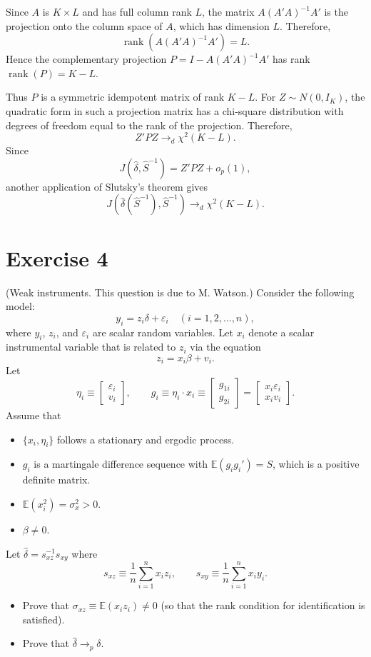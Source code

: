 \documentclass[12pt, letterpaper, onecolumn]{exam}
\begin{document}
\begin{solution}
    Since \(A\) is \(K\times L\) and has full column rank \(L\), the matrix $A(A'A)^{-1}A'$ is the projection onto the column space of \(A\), which has dimension \(L\). Therefore,
    $$
        \operatorname{rank}\!\left(A(A'A)^{-1}A'\right)=L.
    $$
    Hence the complementary projection $P=I-A(A'A)^{-1}A'$ has rank $\operatorname{rank}(P)=K-L.$

    Thus \(P\) is a symmetric idempotent matrix of rank \(K-L\). For \(Z\sim N(0,I_K)\), the quadratic form in such a projection matrix has a chi-square distribution with degrees of freedom equal to the rank of the projection. Therefore,
    $$
        Z'PZ\to_d \chi^2(K-L).
    $$
    Since
    $$
        J(\hat\delta,\hat S^{-1})=Z'PZ+o_p(1),
    $$
    another application of Slutsky's theorem gives
    $$
        J(\hat\delta(\hat S^{-1}),\hat S^{-1})\to_d \chi^2(K-L).
    $$
\end{solution}

\section*{Exercise 4}
 (Weak instruments. This question is due to M. Watson.) Consider the following model:
$$
    y_i = z_i \delta + \varepsilon_i \quad (i = 1,2,\ldots,n),
$$
where $y_i$, $z_i$, and $\varepsilon_i$ are scalar random variables. Let $x_i$ denote a scalar instrumental variable that is related to $z_i$ via the equation
$$
    z_i = x_i \beta + v_i.
$$
Let
$$
    \eta_i \equiv
    \begin{bmatrix}
        \varepsilon_i \\
        v_i
    \end{bmatrix},
    \qquad
    g_i \equiv \eta_i \cdot x_i \equiv
    \begin{bmatrix}
        g_{1i} \\
        g_{2i}
    \end{bmatrix}
    =
    \begin{bmatrix}
        x_i \varepsilon_i \\
        x_i v_i
    \end{bmatrix}.
$$
Assume that
\begin{itemize}
    \item[(1)] $\{x_i,\eta_i\}$ follows a stationary and ergodic process.
    \item[(2)] $g_i$ is a martingale difference sequence with $\mathbb{E}(g_i g_i') = S$, which is a positive definite matrix.
    \item[(3)] $\mathbb{E}(x_i^2)=\sigma_x^2>0$.
    \item[(4)] $\beta \neq 0$.
\end{itemize}
Let $\hat\delta = s_{xz}^{-1}s_{xy}$ where
$$
    s_{xz} \equiv \frac{1}{n}\sum_{i=1}^n x_i z_i,
    \qquad
    s_{xy} \equiv \frac{1}{n}\sum_{i=1}^n x_i y_i.
$$
\begin{itemize}
    \item[(a)] Prove that $\sigma_{xz} \equiv \mathbb{E}(x_i z_i) \neq 0$ (so that the rank condition for identification is satisfied).
    \item[(b)] Prove that $\hat\delta \to_p \delta$.
\end{itemize}
\end{document}

